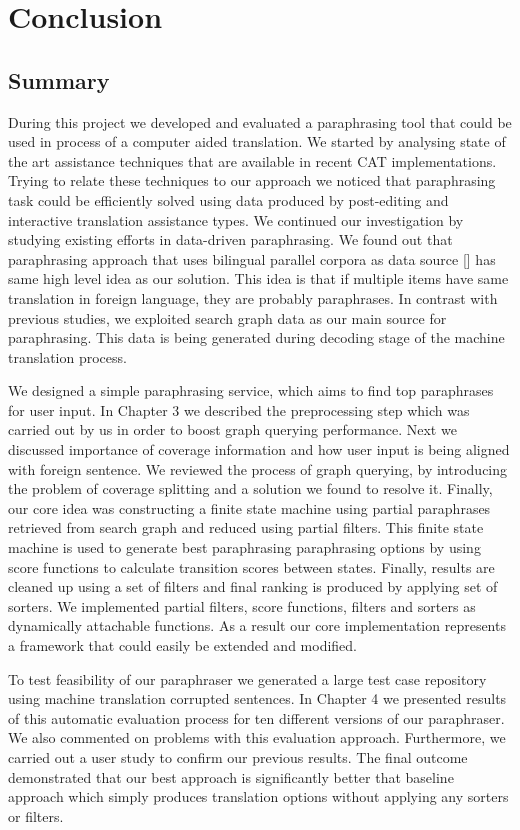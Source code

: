 
\chapter{Conclusion}

\section{Summary}

During this project we developed and evaluated a paraphrasing tool that could be used in process of a computer aided translation. We started by analysing state of the art assistance techniques that are available in recent CAT implementations. Trying to relate these techniques to our approach we noticed that paraphrasing task could be efficiently solved using data produced by post-editing and interactive translation assistance types. We continued our investigation by studying existing efforts in data-driven paraphrasing. We found out that paraphrasing approach that uses bilingual parallel corpora as data source [] has same high level idea as our solution. This idea is that if multiple items have same translation in foreign language, they are probably paraphrases. In contrast with previous studies, we exploited search graph data as our main source for paraphrasing. This data is being generated during decoding stage of the machine translation process.

We designed a simple paraphrasing service, which aims to find top paraphrases for user input. In Chapter 3 we described the preprocessing step which was carried out by us in order to boost graph querying performance. Next we discussed importance of coverage information and how user input is being aligned with foreign sentence. We reviewed the process of graph querying, by introducing the problem of coverage splitting and a solution we found to resolve it. Finally, our core idea was constructing a finite state machine using partial paraphrases retrieved from search graph and reduced using partial filters. This finite state machine is used to generate best paraphrasing paraphrasing options by using score functions to calculate transition scores between states. Finally, results are cleaned up using a set of filters and final ranking is produced by applying set of sorters. We implemented partial filters, score functions, filters and sorters as dynamically attachable functions. As a result our core implementation represents a framework that could easily be extended and modified. 

To test feasibility of our paraphraser we generated a large test case repository using machine translation corrupted sentences. In Chapter 4 we presented results of this automatic evaluation process for ten different versions of our paraphraser. We also commented on problems with this evaluation approach. Furthermore, we carried out a user study to confirm our previous results. The final outcome demonstrated that our best approach is significantly better that baseline approach which simply produces translation options without applying any sorters or filters.

